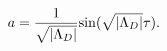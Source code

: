 \begin{equation}
\label{k=-1_-velambda}
a = {1\over {\sqrt {|\Lambda_D|}}}{\rm sin} ({\sqrt 
{|\Lambda_D|}}\tau).
\end{equation}

